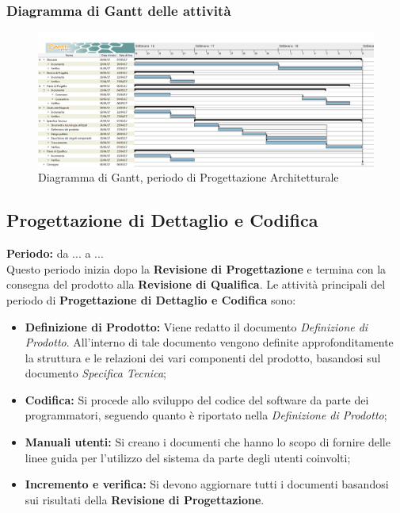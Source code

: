 	\subsubsection{Diagramma di Gantt delle attività}
	\begin{figure}[H]
		\centering
		\includegraphics[width=1\linewidth]{immagini/gantt/progettazione_architetturale.png}
		\caption{Diagramma di Gantt, periodo di Progettazione Architetturale}
	\end{figure}
	\subsection{Progettazione di Dettaglio e Codifica}
	\textbf{Periodo:} da ... a ... \\
	Questo periodo inizia dopo la \textbf{Revisione di Progettazione} e termina con la consegna del prodotto alla \textbf{Revisione di Qualifica}. Le attività principali del periodo di \textbf{Progettazione di Dettaglio e Codifica} sono: \\
	\begin{itemize}
		\item \textbf{Definizione di Prodotto:} Viene redatto il documento \textit{Definizione di Prodotto}. All'interno di tale documento vengono definite approfonditamente la struttura e le relazioni dei vari componenti del prodotto, basandosi sul documento \textit{Specifica Tecnica};
		\item \textbf{Codifica:} Si procede allo sviluppo del codice del software da parte dei programmatori, seguendo quanto è riportato nella \textit{Definizione di Prodotto};
		\item \textbf{Manuali utenti:} Si creano i documenti che hanno lo scopo di fornire delle linee guida per l'utilizzo del sistema da parte degli utenti coinvolti;
		\item \textbf{Incremento e verifica:} Si devono aggiornare tutti i documenti basandosi sui risultati della \textbf{Revisione di Progettazione}. \\
	\end{itemize}
